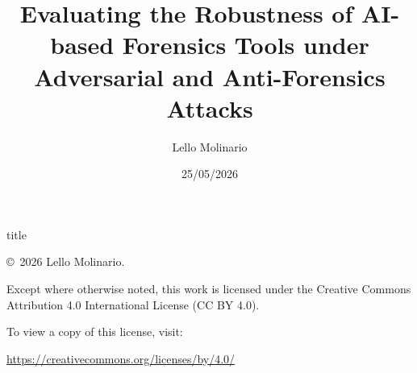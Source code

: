 \documentclass{report}
\title{Evaluating the Robustness of AI-based Forensics Tools under Adversarial and Anti-Forensics Attacks}
\author{Lello Molinario}
\date{25/05/2026}
\begin{document}
\pagestyle{frontmatterstyle}



{title}


\clearpage
\thispagestyle{empty}

\null
\vfill

\begin{center}
\small
\copyright\ 2026 Lello Molinario.

\vspace{1em}

Except where otherwise noted, this work is licensed under the
Creative Commons Attribution 4.0 International License (CC BY 4.0).

\vspace{1em}

To view a copy of this license, visit:

\href{https://creativecommons.org/licenses/by/4.0/}
{https://creativecommons.org/licenses/by/4.0/}
\end{center}

\vspace*{1.5cm}

\clearpage




\clearpage
\pagestyle{empty}

\clearpage
\pagestyle{plain}


\tableofcontents
\clearpage

\listoffigures
\clearpage

\listoftables


\begingroup
\let\cleardoublepage\clearpage
\printglossary[type=\acronymtype,title={Acronyms}]
\endgroup

\glsresetall
\clearpage



\glsresetall

\cleardoublepage
{}
\pagestyle{mainmatterstyle}









\appendix


\cleardoublepage
\printbibliography[heading=bibintoc, title={References}]
\end{document}
